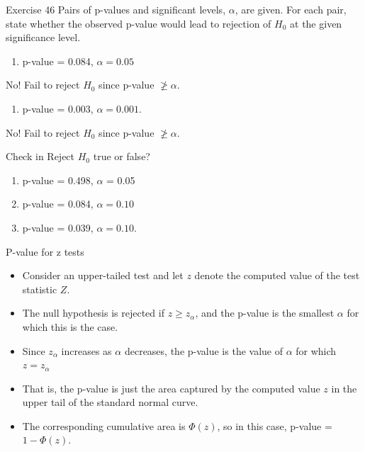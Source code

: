 \documentclass[
  ignorenonframetext,
]{beamer}
\providecommand{\tightlist}{%
  \setlength{\itemsep}{0pt}\setlength{\parskip}{0pt}}\usepackage{longtable,booktabs,array}
\begin{document}
\begin{frame}{Exercise 46}
\protect\hypertarget{exercise-46}{}
Pairs of p-values and significant levels, \(\alpha\), are given. For
each pair, state whether the observed p-value would lead to rejection of
\(H_{0}\) at the given significance level.

\begin{enumerate}[<+->]
[a.]
\tightlist
\item
  p-value = 0.084, \(\alpha = 0.05\)
\end{enumerate}

No! Fail to reject \(H_{0}\) since p-value \(\ngeq \alpha\).

\begin{enumerate}[<+->]
[a.]
\setcounter{enumi}{1}
\tightlist
\item
  p-value = 0.003, \(\alpha = 0.001\).
\end{enumerate}

No! Fail to reject \(H_{0}\) since p-value \(\ngeq \alpha\).
\end{frame}

\begin{frame}{Check in}
\protect\hypertarget{check-in}{}
Reject \(H_{0}\) true or false?

\begin{enumerate}[<+->]
[a.]
\setcounter{enumi}{2}
\item
  p-value = 0.498, \(\alpha\) = 0.05
\item
  p-value = 0.084, \(\alpha = 0.10\)
\item
  p-value = 0.039, \(\alpha = 0.10\).
\end{enumerate}
\end{frame}

\begin{frame}{P-value for z tests}
\protect\hypertarget{p-value-for-z-tests}{}
\begin{itemize}[<+->]
\tightlist
\item
  Consider an upper-tailed test and let \(z\) denote the computed value
  of the test statistic \(Z\).
\item
  The null hypothesis is rejected if \(z \geq z_{\alpha}\), and the
  p-value is the smallest \(\alpha\) for which this is the case.
\item
  Since \(z_{\alpha}\) increases as \(\alpha\) decreases, the p-value is
  the value of \(\alpha\) for which \(z = z_{\alpha}\)
\item
  That is, the p-value is just the area captured by the computed value
  \(z\) in the upper tail of the standard normal curve.
\item
  The corresponding cumulative area is \(\Phi(z)\), so in this case,
  p-value = \(1 - \Phi(z)\).
\end{itemize}
\end{frame}
\end{document}
